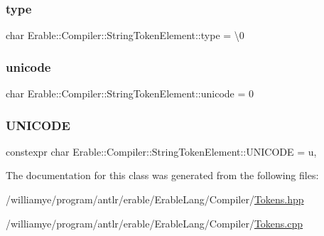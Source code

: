 \subsubsection{\texorpdfstring{type}{type}}
{\footnotesize\ttfamily char Erable\+::\+Compiler\+::\+String\+Token\+Element\+::type = \textquotesingle{}\textbackslash{}0\textquotesingle{}\hspace{0.3cm}{\ttfamily [private]}}

\mbox{\label{class_erable_1_1_compiler_1_1_string_token_element_a15795cbf25a4ea93c90526e76782f331}} 
\subsubsection{\texorpdfstring{unicode}{unicode}}
{\footnotesize\ttfamily char Erable\+::\+Compiler\+::\+String\+Token\+Element\+::unicode = 0\hspace{0.3cm}{\ttfamily [private]}}

\mbox{\label{class_erable_1_1_compiler_1_1_string_token_element_acbcfa0e1743cc408c14479c48c72c031}} 
\subsubsection{\texorpdfstring{UNICODE}{UNICODE}}
{\footnotesize\ttfamily constexpr char Erable\+::\+Compiler\+::\+String\+Token\+Element\+::\+U\+N\+I\+C\+O\+DE = \textquotesingle{}u\textquotesingle{}\hspace{0.3cm}{\ttfamily [static]}, {\ttfamily [private]}}



The documentation for this class was generated from the following files\+:\begin{DoxyCompactItemize}
\item 
/williamye/program/antlr/erable/\+Erable\+Lang/\+Compiler/\mbox{\hyperlink{_tokens_8hpp}{Tokens.\+hpp}}\item 
/williamye/program/antlr/erable/\+Erable\+Lang/\+Compiler/\mbox{\hyperlink{_tokens_8cpp}{Tokens.\+cpp}}\end{DoxyCompactItemize}
